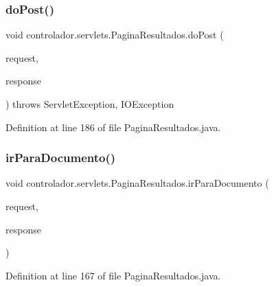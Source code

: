 \subsubsection{\texorpdfstring{do\+Post()}{doPost()}}
{\footnotesize\ttfamily void controlador.\+servlets.\+Pagina\+Resultados.\+do\+Post (\begin{DoxyParamCaption}\item[{Http\+Servlet\+Request}]{request,  }\item[{Http\+Servlet\+Response}]{response }\end{DoxyParamCaption}) throws Servlet\+Exception, I\+O\+Exception\hspace{0.3cm}{\ttfamily [protected]}}



Definition at line 186 of file Pagina\+Resultados.\+java.

\hypertarget{classcontrolador_1_1servlets_1_1PaginaResultados_a4d8d584ec1bdfea0b521460a01f45e25}{}\label{classcontrolador_1_1servlets_1_1PaginaResultados_a4d8d584ec1bdfea0b521460a01f45e25} 
\subsubsection{\texorpdfstring{ir\+Para\+Documento()}{irParaDocumento()}}
{\footnotesize\ttfamily void controlador.\+servlets.\+Pagina\+Resultados.\+ir\+Para\+Documento (\begin{DoxyParamCaption}\item[{Http\+Servlet\+Request}]{request,  }\item[{Http\+Servlet\+Response}]{response }\end{DoxyParamCaption})\hspace{0.3cm}{\ttfamily [private]}}



Definition at line 167 of file Pagina\+Resultados.\+java.

\hypertarget{classcontrolador_1_1servlets_1_1PaginaResultados_a900331c2d1545949444c5c88aeb7a03f}{}\label{classcontrolador_1_1servlets_1_1PaginaResultados_a900331c2d1545949444c5c88aeb7a03f} 
